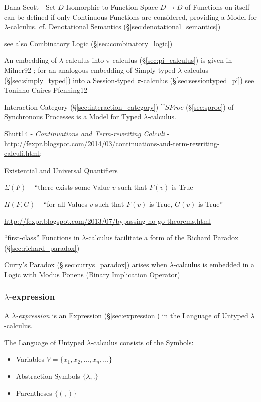 Dana Scott - Set $D$ Isomorphic to Function Space $D \rightarrow D$ of
Functions on itself can be defined if only Continuous Functions are
considered, providing a Model for $\lambda$-calculus. cf. Denotational
Semantics (\S\ref{sec:denotational_semantics})

\fist see also Combinatory Logic (\S\ref{sec:combinatory_logic})

\fist An embedding of $\lambda$-calculus into $\pi$-calculus
(\S\ref{sec:pi_calculus}) is given in Milner92 \cite{milner92}; for an
analogous embedding of Simply-typed $\lambda$-calculus
(\S\ref{sec:simply_typed}) into a Session-typed $\pi$-calculus
(\S\ref{sec:sessiontyped_pi}) see Toninho-Caires-Pfenning12
\cite{caires-pfenning-toninho12}

Interaction Category (\S\ref{sec:interaction_category}) $\cat{SProc}$
(\S\ref{sec:sproc}) of Synchronous Processes is a Model for Typed
$\lambda$-calculus.


Shutt14 - \emph{Continuations and Term-rewriting Calculi} -
\url{http://fexpr.blogspot.com/2014/03/continuations-and-term-rewriting-calculi.html}:

Existential and Universal Quantifiers

$\Sigma(F)$ -- ``there exists some Value $v$ such that $F(v)$ is True

$\Pi(F,G)$ -- ``for all Values $v$ such that $F(v)$ is True, $G(v)$ is
True''

\url{http://fexpr.blogspot.com/2013/07/bypassing-no-go-theorems.html}

``first-class'' Functions in $\lambda$-calculus facilitate a form of
the Richard Paradox (\S\ref{sec:richard_paradox})

Curry's Paradox (\S\ref{sec:currys_paradox}) arises when
$\lambda$-calculus is embedded in a Logic with Modus Ponens (Binary
Implication Operator)



\subsubsection{$\lambda$-expression}\label{sec:lambda_expression}

A \emph{$\lambda$-expression} is an Expression
(\S\ref{sec:expression}) in the Language of Untyped
$\lambda$-calculus.

The Language of Untyped $\lambda$-calculus consists of the Symbols:
\begin{itemize}
  \item Variables $V = \{ x_1, x_2, \ldots, x_n, \ldots \}$
  \item Abstraction Symbols $\{ \lambda, . \}$
  \item Parentheses $\{ (, ) \}$
\end{itemize}

